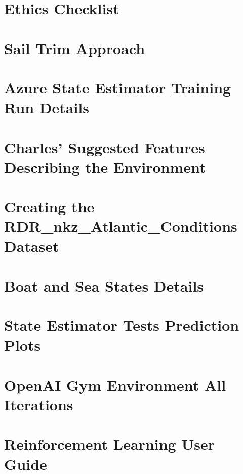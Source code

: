 \documentclass[12pt,twoside]{report}
\begin{document}
\chapter{Ethics Checklist}


\chapter{Sail Trim Approach}


\chapter{Azure State Estimator Training Run Details}


\chapter{Charles' Suggested Features Describing the Environment}


\chapter{Creating the RDR\_nkz\_Atlantic\_Conditions Dataset}


\chapter{Boat and Sea States Details}


\chapter{State Estimator Tests Prediction Plots}


\chapter{OpenAI Gym Environment All Iterations}


\chapter{Reinforcement Learning User Guide}

\end{document}
